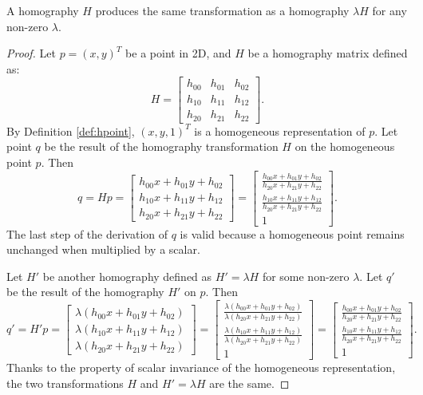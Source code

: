 \documentclass[11pt, oneside, reqno]{book}
\begin{document}
\begin{lemma} \label{lem:H=lambdaH}
	A homography $H$ produces the same transformation as a homography $\lambda H$ for any non-zero $\lambda$. 
\end{lemma}

\begin{proof}
	Let $p = \left(x, y\right)^T$ be a point in 2D, and $H$ be a homography matrix defined as:
	\[
	H = \begin{bmatrix} 
	h_{00} & h_{01} & h_{02} \\
	h_{10} & h_{11} & h_{12} \\
	h_{20} & h_{21} & h_{22}
	\end{bmatrix}.
	\]
	By Definition \ref{def:hpoint}, $\left(x, y, 1\right)^T$ is a homogeneous representation of $p$. Let  point $q$ be the result of the homography transformation $H$ on the homogeneous point $p$. Then 
	\[
	q = Hp = \begin{bmatrix}
	h_{00}x + h_{01}y + h_{02} \\
	h_{10}x + h_{11}y + h_{12} \\
	h_{20}x + h_{21}y + h_{22}
	\end{bmatrix}
	= \begin{bmatrix}
	\frac{h_{00}x + h_{01}y + h_{02}}{h_{20}x + h_{21}y + h_{22}} \\[6 pt]
	\frac{h_{10}x + h_{11}y + h_{12}}{h_{20}x + h_{21}y + h_{22}} \\[4 pt]
	1
	\end{bmatrix}.
	\]
	The last step of the derivation of $q$ is valid because a homogeneous point remains unchanged when multiplied by a scalar.
	
	Let $H'$ be another homography defined as $H' = \lambda H$ for some non-zero $\lambda$. Let $q' $ be the result of the homography $H'$ on $p$. Then 
	\[
	q' = H'p = \begin{bmatrix}
	\lambda\left(h_{00}x + h_{01}y + h_{02}\right) \\[3 pt]
	\lambda\left(h_{10}x + h_{11}y + h_{12}\right) \\[3 pt]
	\lambda\left(h_{20}x + h_{21}y + h_{22}\right)
	\end{bmatrix}
	= \begin{bmatrix}
	\frac{\lambda\left(h_{00}x + h_{01}y + h_{02}\right)}
	{\lambda\left(h_{20}x + h_{21}y + h_{22}\right)} \\[7 pt]
	\frac{\lambda\left(h_{10}x + h_{11}y + h_{12}\right)}
	{\lambda\left(h_{20}x + h_{21}y + h_{22}\right)} \\[5 pt]
	1
	\end{bmatrix}
	= \begin{bmatrix}
	\frac{h_{00}x + h_{01}y + h_{02}}{h_{20}x + h_{21}y + h_{22}} \\[7 pt]
	\frac{h_{10}x + h_{11}y + h_{12}}{h_{20}x + h_{21}y + h_{22}} \\[5 pt]
	1
	\end{bmatrix}.
	\]
	Thanks to the property of scalar invariance of the homogeneous representation, the two transformations $H$ and $H' = \lambda H$ are the same.
\end{proof}
\end{document}

